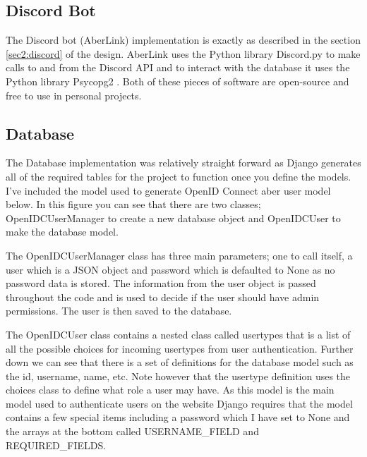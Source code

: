 \subsection{Discord Bot}
The Discord bot (AberLink) implementation is exactly as described in the section \ref{sec2:discord} of the design. AberLink uses the Python library Discord.py \cite{discord.py} to make calls to and from the Discord API and to interact with the database it uses the Python library Psycopg2 \cite{psycopg2}. Both of these pieces of software are open-source and free to use in personal projects. 

\subsection{Database}\label{sec3:database}
The Database implementation was relatively straight forward as Django \cite{Django} generates all of the required tables for the project to function once you define the models. I've included the model used to generate OpenID Connect \cite{OpenID} aber user model below. In this figure you can see that there are two classes; OpenIDCUserManager to create a new database object and OpenIDCUser to make the database model. 

The OpenIDCUserManager class has three main parameters; one to call itself, a user which is a JSON object and password which is defaulted to None as no password data is stored. The information from the user object is passed throughout the code and is used to decide if the user should have admin permissions. The user is then saved to the database.

The OpenIDCUser class contains a nested class called usertypes that is a list of all the possible choices for incoming usertypes from user authentication. Further down we can see that there is a set of definitions for the database model such as the id, username, name, etc. Note however that the usertype definition uses the choices class to define what role a user may have. As this model is the main model used to authenticate users on the website Django requires that the model contains a few special items including a password which I have set to None and the arrays at the bottom called USERNAME\_FIELD and REQUIRED\_FIELDS.

